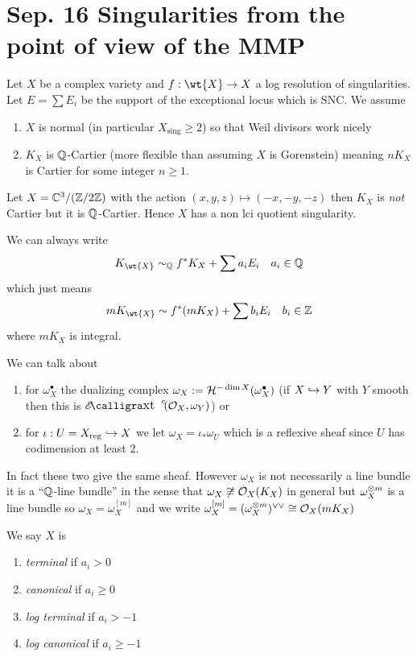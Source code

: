 \documentclass[12pt]{article}
\begin{document}
\section{Sep. 16 Singularities from the point of view of the MMP}

Let $X$ be a complex variety and $f : \wt{X} \to X$ a log resolution of singularities. Let $E = \sum E_i$ be the support of the exceptional locus which is SNC. We assume
\begin{enumerate}
\item $X$ is normal (in particular $X_{\text{sing}} \ge 2$) so that Weil divisors work nicely 
\item $K_X$ is $\mathbb{Q}$-Cartier (more flexible than assuming $X$ is Gorenstein) meaning $n K_X$ is Cartier for some integer $n \ge 1$. 
\end{enumerate}

\begin{exercise}
Let $X = \mathbb{C}^3 / (\mathbb{Z} / 2 \mathbb{Z})$ with the action $(x,y,z) \mapsto (-x,-y,-z)$ then $K_X$ is \textit{not} Cartier but it is $\mathbb{Q}$-Cartier. Hence $X$ has a non lci quotient singularity. 
\end{exercise}

We can always write 
\[ K_{\wt{X}} \sim_{\Q} f^* K_X + \sum a_i E_i \quad a_i \in \Q \]
which just means
\[ m K_{\wt{X}} \sim f^* (m K_X) + \sum b_i E_i \quad b_i \in \Z \]
where $m K_X$ is integral. 

\newcommand{\reg}{\mathrm{reg}}

\begin{rmk}
We can talk about 
\begin{enumerate}
\item for $\omega_X^\bullet$ the dualizing complex $\omega_X := \mathcal{H}^{-\dim{X}}(\omega_X^\bullet)$ (if $X \hookrightarrow Y$ with $Y$ smooth then this is $\shExt{c}{}{\struct{X}}{\omega_Y}$) or
\item for $\iota : U = X_{\reg} \embed X$ we let $\omega_X = \iota_* \omega_{U}$ which is a reflexive sheaf since $U$ has codimension at least $2$.
\end{enumerate}
In fact these two give the same sheaf. However $\omega_X$ is not necessarily a line bundle it is a ``$\mathbb{Q}$-line bundle'' in the sense that $\omega_X \not\cong \mathcal{O}_{X}(K_X)$ in general but $\omega_X^{\otimes m}$ is a line bundle so $\omega_X = \omega_X^{[m]}$ and we write $\omega_X^{[m]} = (\omega_X^{\otimes m})^{\vee \vee} \cong \mathcal{O}_{X}(m K_X)$ 
\end{rmk}

\begin{defn}
We say $X$ is 
\begin{enumerate}
\item \textit{terminal} if $a_i > 0$
\item \textit{canonical} if $a_i \ge 0$
\item \textit{log terminal} if $a_i > -1$
\item \textit{log canonical} if $a_i \ge -1$
\end{enumerate}
\end{defn}
\end{document}

